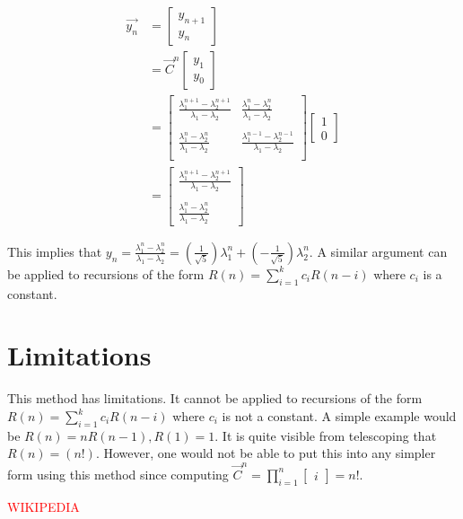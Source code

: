 \documentclass{article}
\begin{document}
\begin{align*} 
\vec{y_{n}}
&=  
\begin{bmatrix}
y_{n+1} \\
y_{n} 
\end{bmatrix}\\
&=
\vec{C}^{n}
\begin{bmatrix}
y_{1} \\
y_{0} 
\end{bmatrix}\\
&=
\begin{bmatrix}
\frac{\lambda_{1}^{n+1} - \lambda_{2}^{n+1}}{\lambda_{1}-\lambda_{2}} 
& \frac{\lambda_{1}^{n} - \lambda_{2}^{n}}{\lambda_{1}-\lambda_{2}}\\
 & \\
\frac{\lambda_{1}^{n} - \lambda_{2}^{n}}{\lambda_{1}-\lambda_{2}} 
& \frac{\lambda_{1}^{n-1} - \lambda_{2}^{n-1}}{\lambda_{1}-\lambda_{2}} \\
\end{bmatrix}
\begin{bmatrix}
1 \\
0 
\end{bmatrix}\\
&=
\begin{bmatrix}
\frac{\lambda_{1}^{n+1} - \lambda_{2}^{n+1}}{\lambda_{1}-\lambda_{2}} \\
\\
\frac{\lambda_{1}^{n} - \lambda_{2}^{n}}{\lambda_{1}-\lambda_{2}}
\end{bmatrix}
\end{align*}

This implies that 
$y_{n}=\frac{\lambda_{1}^{n} - \lambda_{2}^{n}}{\lambda_{1}-\lambda_{2}}=\left(\frac{1}{\sqrt{5}}\right)\lambda_{1}^{n}+\left(-\frac{1}{\sqrt{5}}\right)\lambda_{2}^{n}$.
A similar argument can be applied to recursions of the form 
$R(n)=\sum_{i=1}^{k}c_{i}R(n-i)$ where $c_{i}$ is a constant.

\section{Limitations}
This method has limitations. It cannot be applied to recursions of the form 
$R(n)=\sum_{i=1}^{k}c_{i}R(n-i)$ where $c_{i}$ is not a constant. A
simple example would be $R(n)=nR(n-1), R(1)=1$. It is quite visible from 
telescoping that $R(n)=(n!)$. However, one would not be able to put this into
any simpler form using this method since computing 
$\vec{C}^n=\prod_{i=1}^{n}\begin{bmatrix}i\end{bmatrix}=n! $.

\begin{thebibliography}{9}

\textcolor{red}{WIKIPEDIA}

\end{thebibliography} %
 
\end{document}
